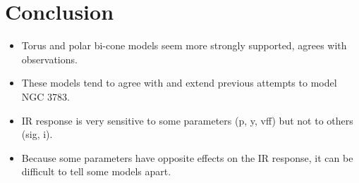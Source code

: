 \section{Conclusion}
\begin{itemize}
    \item Torus and polar bi-cone models seem more strongly supported, agrees with observations.
    \item These models tend to agree with and extend previous attempts to model NGC 3783.
    \item IR response is very sensitive to some parameters (p, y, vff) but not to others (sig, i).
    \item Because some parameters have opposite effects on the IR response, it can be difficult to tell some models apart.
\end{itemize}